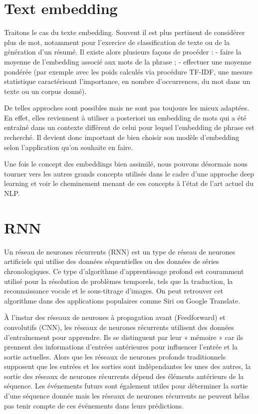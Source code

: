 \documentclass[8pt]{article}
\begin{document}
    \hypertarget{text-embedding}{%
\section{Text embedding}\label{text-embedding}}

    Traitons le cas du texte embedding. Souvent il est plus pertinent de
considérer plus de mot, notamment pour l'exercice de classification de
texte ou de la génération d'un résumé. Il existe alors plusieurs façons
de procéder : - faire la moyenne de l'embedding associé aux mots de la
phrase ; - effectuer une moyenne pondérée (par exemple avec les poids
calculés via procédure TF-IDF, une mesure statistique caractérisant
l'importance, en nombre d'occurrences, du mot dans un texte ou un corpus
donné).

De telles approches sont possibles mais ne sont pas toujours les mieux
adaptées. En effet, elles reviennent à utiliser a posteriori un
embedding de mots qui a été entraîné dans un contexte différent de celui
pour lequel l'embedding de phrase est recherché. Il devient donc
important de bien choisir son modèle d'embedding selon l'application
qu'on souhaite en faire.

Une fois le concept des embeddings bien assimilé, nous pouvons désormais
nous tourner vers les autres grands concepts utilisés dans le cadre
d'une approche deep learning et voir le cheminement menant de ces
concepts à l'état de l'art actuel du NLP.

    \hypertarget{rnn}{%
\section{RNN}\label{rnn}}

    Un réseau de neurones récurrents (RNN) est un type de réseau de neurones
artificiels qui utilise des données séquentielles ou des données de
séries chronologiques. Ce type d'algorithme d'apprentissage profond est
couramment utilisé pour la résolution de problèmes temporels, tels que
la traduction, la reconnaissance vocale et le sous-titrage d'images. On
peut retrouver cet algorithme dans des applications populaires comme
Siri ou Google Translate.

À l'instar des réseaux de neurones à propagation avant (Feedforward) et
convolutifs (CNN), les réseaux de neurones récurrents utilisent des
données d'entraînement pour apprendre. Ils se distinguent par leur «
mémoire » car ils prennent des informations d'entrées antérieures pour
influencer l'entrée et la sortie actuelles. Alors que les réseaux de
neurones profonds traditionnels supposent que les entrées et les sorties
sont indépendantes les unes des autres, la sortie des réseaux de
neurones récurrents dépend des éléments antérieurs de la séquence. Les
événements futurs sont également utiles pour déterminer la sortie d'une
séquence donnée mais les réseaux de neurones récurrents ne peuvent hélas
pas tenir compte de ces événements dans leurs prédictions.
\end{document}
